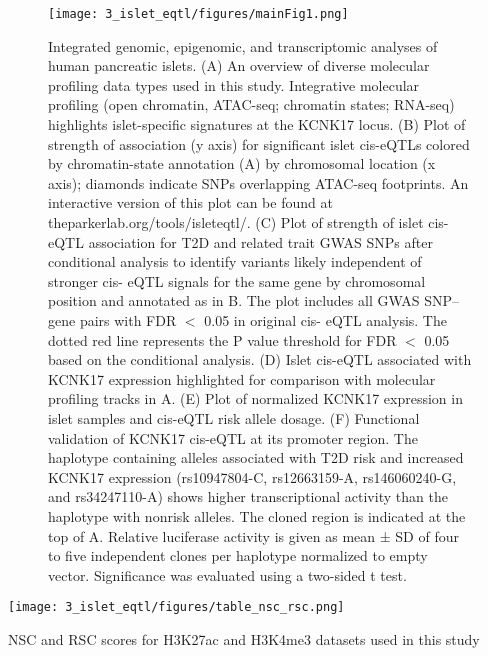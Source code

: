 \begin{figure}
    \centering
    \texttt{[image: 3\_islet\_eqtl/figures/mainFig1.png]}
    \caption[Integrated genomic, epigenomic, and transcriptomic analyses of human pancreatic islets]{Integrated genomic, epigenomic, and transcriptomic analyses of human pancreatic islets. (A) An overview of diverse molecular profiling data types used in this study. Integrative molecular profiling (open chromatin, ATAC-seq; chromatin states; RNA-seq) highlights islet-specific signatures at the KCNK17 locus. (B) Plot of strength of association (y axis) for significant islet cis-eQTLs colored by chromatin-state annotation (A) by chromosomal location (x axis); diamonds indicate SNPs overlapping ATAC-seq footprints. An interactive version of this plot can be found at theparkerlab.org/tools/isleteqtl/. (C) Plot of strength of islet cis-eQTL association for T2D and related trait GWAS SNPs after conditional analysis to identify variants likely independent of stronger cis- eQTL signals for the same gene by chromosomal position and annotated as in B. The plot includes all GWAS SNP–gene pairs with FDR $<$ 0.05 in original cis- eQTL analysis. The dotted red line represents the P value threshold for FDR $<$ 0.05 based on the conditional analysis. (D) Islet cis-eQTL associated with KCNK17 expression highlighted for comparison with molecular profiling tracks in A. (E) Plot of normalized KCNK17 expression in islet samples and cis-eQTL risk allele dosage. (F) Functional validation of KCNK17 cis-eQTL at its promoter region. The haplotype containing alleles associated with T2D risk and increased KCNK17 expression (rs10947804-C, rs12663159-A, rs146060240-G, and rs34247110-A) shows higher transcriptional activity than the haplotype with nonrisk alleles. The cloned region is indicated at the top of A. Relative luciferase activity is given as mean ± SD of four to five independent clones per haplotype normalized to empty vector. Significance was evaluated using a two-sided t test.}
    \label{fig:c2_f1}
\end{figure}

\begin{table}
  \centering
  \texttt{[image: 3\_islet\_eqtl/figures/table\_nsc\_rsc.png]}
  \caption[\ac{NSC} and \ac{RSC} scores for H3K27ac and H3K4me3 datasets used in this study]{\ac{NSC} and \ac{RSC} scores for H3K27ac and H3K4me3 datasets used in this study}
  \label{tbl:c2_t1}
  
\end{table}

